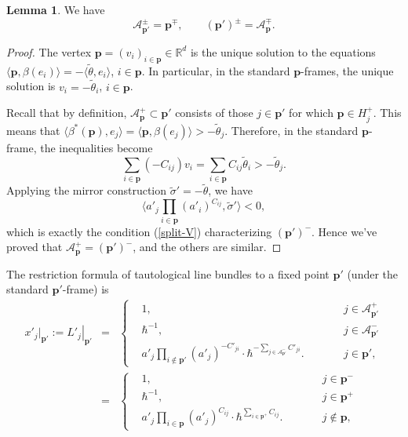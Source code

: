 \documentclass[10pt]{amsart}
\theoremstyle{definition}
\def\be{\begin{eqnarray}}
\def\ee{\end{eqnarray}}
\def\RR{{\mathbb{R}}}
\newcommand{\bp}{\mathbf{p}}
\newcommand{\cA}{\mathcal{A}}
\theoremstyle{definition}
\numberwithin{equation}{section}
\theoremstyle{Theorem}
\newtheorem{Lemma}[Definition]{Lemma}
\begin{document}
\begin{Lemma} \label{V-V'}
We have
$$
\cA_{\bp'}^{\pm} = \bp^\mp, \qquad (\bp')^\pm = \cA_\bp^\mp .
$$
\end{Lemma}

\begin{proof}
The vertex $\bp = (v_i)_{i\in \bp} \in \RR^d$ is the unique solution to the equations $\langle \bp, \beta (e_i) \rangle = - \langle \widetilde\theta, e_i \rangle$, $i\in \bp$. In particular, in the standard $\bp$-frames, the unique solution is $v_i = -\widetilde\theta_i$, $i\in \bp$.

Recall that by definition, $\cA_\bp^+ \subset \bp'$ consists of those $j\in \bp'$ for which $\bp \in H_j^+$. This means that $\langle \beta^* (\bp), e_j \rangle = \langle \bp, \beta (e_j) \rangle > - \widetilde\theta_j$. Therefore, in the standard $\bp$-frame, the inequalities become
$$
\sum_{i\in \bp} (-C_{ij}) v_i =  \sum_{i\in \bp} C_{ij} \widetilde\theta_i > - \widetilde\theta_j.
$$
Applying the mirror construction $\widetilde\sigma' = - \widetilde\theta$, we have
$$
\langle a'_j \prod_{i\in \bp} (a'_i)^{C_{ij}} , \widetilde\sigma' \rangle < 0,
$$
which is exactly the condition (\ref{split-V}) characterizing $(\bp')^-$. Hence we've proved that $\cA_\bp^+ = (\bp')^-$, and the others are similar.
\end{proof}



The restriction formula of tautological line bundles to a fixed point $\bp'$ (under the standard $\bp'$-frame) is
\be \label{restriction-V'}
x'_j |_{\bp'}  := \left.  L'_j \right|_{\bp'} &=& \left\{ \begin{aligned}
	& 1 , \qquad && j \in \cA_{\bp'}^+ \\
	& \hbar^{-1}, \qquad && j \in \cA_{\bp'}^- \\
	& a'_j \prod_{i\not\in \bp'} (a'_j)^{-C'_{ji}} \cdot  \hbar^{- \sum_{j \in \cA_{\bp'}^-} C'_{ji} } .  \qquad && j \in \bp',
\end{aligned} \right.    \nonumber  \\
&=& \left\{ \begin{aligned}
	& 1 , \qquad && j \in \bp^- \\
	& \hbar^{-1}, \qquad && j \in \bp^+ \\
	& a'_j \prod_{i\in \bp} (a'_j)^{C_{ij}} \cdot  \hbar^{ \sum_{i \in \bp^+} C_{ij} } .  \qquad && j \not\in \bp,
\end{aligned} \right.
\ee
\end{document}
